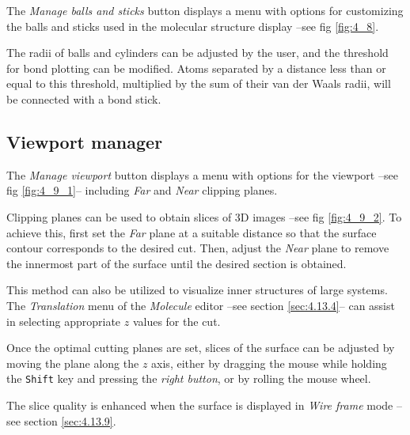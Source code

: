\documentclass[10pt]{article}
\begin{document}
The {\it Manage balls and sticks} button displays a menu with options  
for customizing the balls and sticks used in the molecular structure display --see fig \ref{fig:4_8}.  

The radii of balls and cylinders can be adjusted by the user, and the threshold for  
bond plotting can be modified. Atoms separated by a distance less than or equal to  
this threshold, multiplied by the sum of their van der Waals radii,  
will be connected with a bond stick.  


\subsection{Viewport manager \label{sec:4.9}}

The {\it Manage viewport} button displays a menu with 
options for the viewport --see fig \ref{fig:4_9_1}-- 
including {\it Far} and {\it Near} clipping planes.  

Clipping planes can be used to obtain slices of 3D images --see fig 
\ref{fig:4_9_2}. To achieve this, first set the {\it Far} plane at a 
suitable distance so that 
the surface contour corresponds to the desired cut. Then, adjust the {\it Near} plane 
to remove the innermost part of the surface 
until the desired section is obtained.  

This method can also be utilized to visualize inner structures of 
large systems.  
The {\it Translation} menu of the {\it Molecule} editor --see section \ref{sec:4.13.4}--  
can assist in selecting appropriate $z$ values for the cut.  

Once the optimal cutting planes are set, slices of the surface can be  
adjusted by moving the plane along the $z$ axis, either by dragging the mouse  
while holding the \texttt{Shift} key and pressing the {\it right button}, or by rolling  
the mouse wheel.  

The slice quality is enhanced when the surface is displayed in {\it Wire frame} mode --see section \ref{sec:4.13.9}.  
\end{document}
